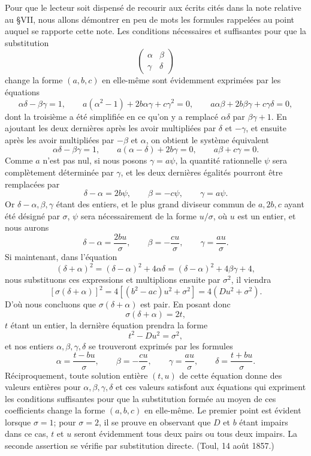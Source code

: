 \documentclass[11pt]{article}
\begin{document}
Pour que le lecteur soit dispensé de recourir aux écrits cités dans la note relative au \S VII, nous allons démontrer en peu de mots les formules rappelées au point auquel se rapporte cette note. Les conditions nécessaires et suffisantes pour que la substitution
\[
  \begin{pmatrix}\alpha&\beta\\ \gamma&\delta\end{pmatrix}
\]
change la forme $(a,b,c)$ en elle-même sont évidemment exprimées par les équations
\[
  \alpha\delta-\beta\gamma=1,
  \qquad
  a(\alpha^2-1)+2b\alpha\gamma+c\gamma^2=0,
  \qquad
  a\alpha\beta+2b\beta\gamma+c\gamma\delta=0,
\]
dont la troisième a été simplifiée en ce qu'on y a remplacé $\alpha\delta$ par $\beta\gamma+1$. En ajoutant les deux dernières après les avoir multipliées par $\delta$ et $-\gamma$, et ensuite après les avoir multipliées par $-\beta$ et $\alpha$, on obtient le système équivalent
\[
  \alpha\delta-\beta\gamma=1,
  \qquad
  a(\alpha-\delta)+2b\gamma=0,
  \qquad
  a\beta+c\gamma=0.
\]
Comme $a$ n'est pas nul, si nous posons $\gamma=a\psi$, la quantité rationnelle $\psi$ sera complètement déterminée par $\gamma$, et les deux dernières égalités pourront être remplacées par
\[
  \delta-\alpha=2b\psi,
  \qquad
  \beta=-c\psi,
  \qquad
  \gamma=a\psi.
\]
Or $\delta-\alpha,\beta,\gamma$ étant des entiers, et le plus grand diviseur commun de $a,2b,c$ ayant été désigné par $\sigma$, $\psi$ sera nécessairement de la forme $u/\sigma$, où $u$ est un entier, et nous aurons
\[
  \delta-\alpha=\frac{2bu}{\sigma},\qquad
  \beta=-\frac{cu}{\sigma},\qquad
  \gamma=\frac{au}{\sigma}.
\]
Si maintenant, dans l'équation
\[
 (\delta+\alpha)^2=(\delta-\alpha)^2+4\alpha\delta
             =(\delta-\alpha)^2+4\beta\gamma+4,
\]
nous substituons ces expressions et multiplions ensuite par $\sigma^2$, il viendra
\[
  [\sigma(\delta+\alpha)]^2=4[(b^2-ac)u^2+\sigma^2]
     =4(Du^2+\sigma^2).
\]
D'où nous concluons que $\sigma(\delta+\alpha)$ est pair. En posant donc
\[
  \sigma(\delta+\alpha)=2t,
\]
$t$ étant un entier, la dernière équation prendra la forme
\[
  t^2-Du^2=\sigma^2,
\]
et nos entiers $\alpha,\beta,\gamma,\delta$ se trouveront exprimés par les formules
\[
 \alpha=\frac{t-bu}{\sigma},\qquad
 \beta=-\frac{cu}{\sigma},\qquad
 \gamma=\frac{au}{\sigma},\qquad
 \delta=\frac{t+bu}{\sigma}.
\]
Réciproquement, toute solution entière $(t,u)$ de cette équation donne des valeurs entières pour $\alpha,\beta,\gamma,\delta$ et ces valeurs satisfont aux équations qui expriment les conditions suffisantes pour que la substitution formée au moyen de ces coefficients change la forme $(a,b,c)$ en elle-même. Le premier point est évident lorsque $\sigma=1$; pour $\sigma=2$, il se prouve en observant que $D$ et $b$ étant impairs dans ce cas, $t$ et $u$ seront évidemment tous deux pairs ou tous deux impairs. La seconde assertion se vérifie par substitution directe. \hfill(Toul, 14 août 1857.)
\end{document}
